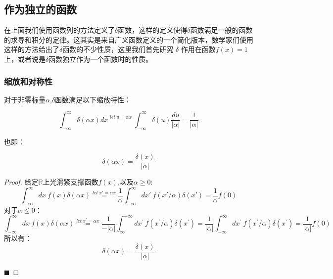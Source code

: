 \documentclass[lang=cn,10pt,newtx,bibend=biber,device=pad]{elegantbook}
\begin{document}
\subsection{作为独立的函数}
在上面我们使用函数列的方法定义了$\delta$函数，这样的定义使得$\delta$函数满足一般的函数的求导和积分的定律。这其实是来自广义函数定义的一个简化版本，数学家们使用这样的方法给出了$\delta$函数的不少性质，这里我们首先研究 $\delta$ 作用在函数$f(x)=1$上，或者说是$\delta$函数独立作为一个函数时的性质。

\subsubsection{缩放和对称性}\cite{strichartz1994distribution}

对于非零标量$\alpha$,$\delta$函数满足以下缩放特性：
\begin{property}
\begin{equation}
    \int_{-\infty}^{\infty}\delta(\alpha x)dx \overset{let \ u=\alpha x}{=} \int_{-\infty}^{\infty}\delta(u)\frac{du}{|\alpha|} = \frac{1}{|\alpha|}    
\end{equation}

也即：

\begin{equation}
\delta(\alpha x) = \frac{\delta(x)}{|\alpha|}
\end{equation}
\end{property}
\begin{proof}
给定$\mathbb{R}$上光滑紧支撑函数$f(x)$,以及$\alpha\ge 0$:
\begin{equation}
    \int_{-\infty}^{\infty} dx\ f(x)\delta(\alpha x) \overset{let \ x'=\alpha x}{=}\frac{1}{\alpha}\int_{-\infty}^{\infty} dx'\ f(x'/\alpha)\delta(x') = \frac{1}{\alpha}f(0)
\end{equation}
对于$\alpha\le0$：
\begin{equation}
    \int_{-\infty}^{\infty}dx\ f(x)\delta(\alpha x)\overset{let\ x^{\prime}=\alpha x}{=}\frac{1}{-|\alpha|}\int_{\infty}^{-\infty}dx^{\prime}\ f(x^{\prime}/\alpha)\delta(x^{\prime})=\frac{1}{|\alpha|}\int_{-\infty}^{\infty}dx^{\prime}\ f(x^{\prime}/\alpha)\delta(x^{\prime})=\frac{1}{|\alpha|}f(0)
\end{equation}
所以有：
\begin{equation}
    \delta(\alpha x) = \frac{\delta(x)}{|\alpha|}
\end{equation}

$\blacksquare$
\end{proof}
\end{document}
